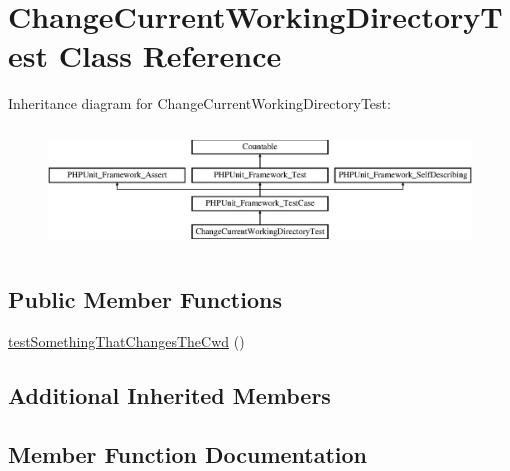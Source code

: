\hypertarget{class_change_current_working_directory_test}{}\section{Change\+Current\+Working\+Directory\+Test Class Reference}
\label{class_change_current_working_directory_test}
Inheritance diagram for Change\+Current\+Working\+Directory\+Test\+:\begin{figure}[H]
\begin{center}
\leavevmode
\includegraphics[height=3.260553cm]{class_change_current_working_directory_test}
\end{center}
\end{figure}
\subsection*{Public Member Functions}
\begin{DoxyCompactItemize}
\item 
\mbox{\hyperlink{class_change_current_working_directory_test_adecad16c9e37de675099051131f62ba1}{test\+Something\+That\+Changes\+The\+Cwd}} ()
\end{DoxyCompactItemize}
\subsection*{Additional Inherited Members}


\subsection{Member Function Documentation}
\mbox{\label{class_change_current_working_directory_test_adecad16c9e37de675099051131f62ba1}} 
